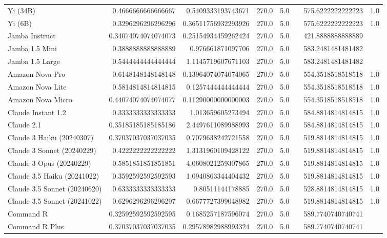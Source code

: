 \begin{table}[htp]
{\begin{tabular}{lrrrrrrr}
Yi (34B) & 0.4666666666666667 & 0.5409333193743671 & 270.0 & 5.0 &  & 575.6222222222223 & 1.0 \\
Yi (6B) & 0.3296296296296296 & 0.36511756932293926 & 270.0 & 5.0 &  & 575.6222222222223 & 1.0 \\
Jamba Instruct & 0.34074074074074073 & 0.25154934459262424 & 270.0 & 5.0 &  & 421.8888888888889 &  \\
Jamba 1.5 Mini & 0.3888888888888889 & 0.976661871097706 & 270.0 & 5.0 &  & 583.2481481481482 &  \\
Jamba 1.5 Large & 0.5444444444444444 & 1.1145719607671103 & 270.0 & 5.0 &  & 583.2481481481482 &  \\
Amazon Nova Pro & 0.6148148148148148 & 0.13964074074074065 & 270.0 & 5.0 &  & 554.3518518518518 & 1.0 \\
Amazon Nova Lite & 0.5814814814814815 & 0.1257444444444444 & 270.0 & 5.0 &  & 554.3518518518518 & 1.0 \\
Amazon Nova Micro & 0.44074074074074077 & 0.11290000000000003 & 270.0 & 5.0 &  & 554.3518518518518 & 1.0 \\
Claude Instant 1.2 & 0.3333333333333333 & 1.013659605273494 & 270.0 & 5.0 &  & 584.8814814814815 & 1.0 \\
Claude 2.1 & 0.35185185185185186 & 2.4497611089988993 & 270.0 & 5.0 &  & 584.8814814814815 & 1.0 \\
Claude 3 Haiku (20240307) & 0.37037037037037035 & 0.7079638242721558 & 270.0 & 5.0 &  & 519.8814814814815 & 1.0 \\
Claude 3 Sonnet (20240229) & 0.4222222222222222 & 1.3131960109428122 & 270.0 & 5.0 &  & 519.8814814814815 & 1.0 \\
Claude 3 Opus (20240229) & 0.5851851851851851 & 4.0608021259307865 & 270.0 & 5.0 &  & 519.8814814814815 & 1.0 \\
Claude 3.5 Haiku (20241022) & 0.3592592592592593 & 1.0940863344404432 & 270.0 & 5.0 &  & 519.8814814814815 & 1.0 \\
Claude 3.5 Sonnet (20240620) & 0.6333333333333333 & 0.80511144178885 & 270.0 & 5.0 &  & 528.8814814814815 & 1.0 \\
Claude 3.5 Sonnet (20241022) & 0.6296296296296297 & 0.6677727399048982 & 270.0 & 5.0 &  & 519.8814814814815 & 1.0 \\
Command R & 0.32592592592592595 & 0.1685257187596074 & 270.0 & 5.0 &  & 589.7740740740741 &  \\
Command R Plus & 0.37037037037037035 & 0.29578982988993324 & 270.0 & 5.0 &  & 589.7740740740741 &  \\

\end{tabular}}
\end{table}
